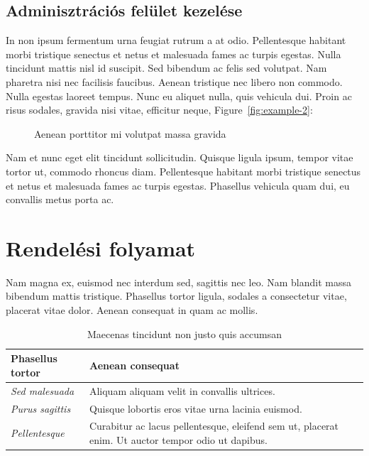 \subsection{Adminisztrációs felület kezelése} %

In non ipsum fermentum urna feugiat rutrum a at odio. Pellentesque habitant morbi tristique senectus et netus et malesuada fames ac turpis egestas. Nulla tincidunt mattis nisl id suscipit. Sed bibendum ac felis sed volutpat. Nam pharetra nisi nec facilisis faucibus. Aenean tristique nec libero non commodo. Nulla egestas laoreet tempus. Nunc eu aliquet nulla, quis vehicula dui. Proin ac risus sodales, gravida nisi vitae, efficitur neque, Figure~\ref{fig:example-2}:

\begin{figure}[H]
	\centering
	\hspace{5pt}
	\caption{Aenean porttitor mi volutpat massa gravida}
	\label{fig:example-3}
\end{figure}

Nam et nunc eget elit tincidunt sollicitudin. Quisque ligula ipsum, tempor vitae tortor ut, commodo rhoncus diam. Pellentesque habitant morbi tristique senectus et netus et malesuada fames ac turpis egestas. Phasellus vehicula quam dui, eu convallis metus porta ac.


\section{Rendelési folyamat} %

Nam magna ex, euismod nec interdum sed, sagittis nec leo. Nam blandit massa bibendum mattis tristique. Phasellus tortor ligula, sodales a consectetur vitae, placerat vitae dolor. Aenean consequat in quam ac mollis. 

\begin{table}[H]
	\centering
	\begin{tabular}{ | m{} | m{} | }
		\hline
		\textbf{Phasellus tortor} & \textbf{Aenean consequat} \\
		\hline \hline
		\emph{Sed malesuada} & Aliquam aliquam velit in convallis ultrices. \\
		\hline
		\emph{Purus sagittis} &  Quisque lobortis eros vitae urna lacinia euismod. \\
		\hline
		\emph{Pellentesque} & Curabitur ac lacus pellentesque, eleifend sem ut, placerat enim. Ut auctor tempor odio ut dapibus. \\
		\hline
	\end{tabular}
	\caption{Maecenas tincidunt non justo quis accumsan}
	\label{tab:example-1}
\end{table}

